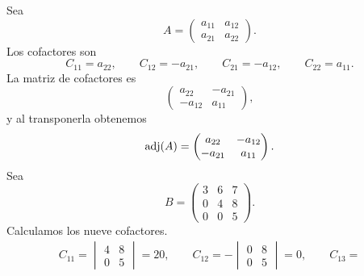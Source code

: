 \documentclass[12pt,a4paper]{article}
\begin{document}
    \begin{solucion}
        Sea
        \begin{equation*}
            A=
            \begin{pmatrix}
                a_{11} & a_{12}\\
                a_{21} & a_{22}
            \end{pmatrix}.
        \end{equation*}
        Los cofactores son
        \begin{equation*}
            C_{11}=a_{22},\qquad C_{12}=-a_{21},\qquad C_{21}=-a_{12},\qquad C_{22}=a_{11}.
        \end{equation*}
        La matriz de cofactores es
        \begin{equation*}
            \begin{pmatrix}
                a_{22} & -a_{21}\\
                -a_{12} & a_{11}
            \end{pmatrix},
        \end{equation*}
        y al transponerla obtenemos
        \begin{equation*}
            \operatorname{adj}(A)=
            \begin{pmatrix}
                a_{22} & -a_{12}\\
                -a_{21} & a_{11}
            \end{pmatrix}.
        \end{equation*}
        Sea
        \begin{equation*}
            B=
            \begin{pmatrix}
                3 & 6 & 7\\
                0 & 4 & 8\\
                0 & 0 & 5
            \end{pmatrix}.
        \end{equation*}
        Calculamos los nueve cofactores.
        \begin{gather*}
            C_{11}=
            \begin{vmatrix}
                4 & 8\\
                0 & 5
            \end{vmatrix}
            =20, \qquad C_{12}=
            -\begin{vmatrix}
                0 & 8\\
                0 & 5
            \end{vmatrix}
            =0,\qquad C_{13}=

\end{gather*}
\end{solucion}
\end{document}
